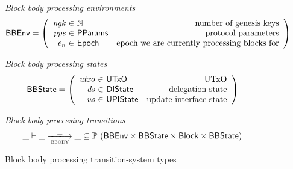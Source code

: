 \documentclass[11pt,a4paper]{article}
\newcommand{\powerset}[1]{\mathbb{P}~#1}
\newcommand{\var}[1]{\mathit{#1}}
\newcommand{\type}[1]{\mathsf{#1}}
\newcommand{\trans}[2]{\xlongrightarrow[\textsc{#1}]{#2}}
\newcommand{\Block}{\type{Block}}
\newcommand{\ProtParams}{\type{PParams}} %
\begin{document}
\begin{figure}[ht]
  \emph{Block body processing environments}
  \begin{equation*}
    \BBEnv =
    \left(
      \begin{array}{r@{~\in~}lr}
        \var{ngk} & \mathbb{N} & \text{number of genesis keys}\\
        \var{pps} & \ProtParams & \text{protocol parameters} \\
        \var{e_n} & \Epoch & \text{epoch we are currently processing blocks for}
      \end{array}
    \right)
  \end{equation*}

  \emph{Block body processing states}
  \begin{equation*}
    \BBState =
    \left(
      \begin{array}{r@{~\in~}lr}
        \var{utxo} & \UTxO & \text{UTxO} \\
        \var{ds} & \DIState & \text{delegation state} \\
        \var{us} & \UPIState & \text{update interface state}
      \end{array}
    \right)
  \end{equation*}

  \emph{Block body processing transitions}
  \begin{equation*}
    \_ \vdash \var{\_} \trans{bbody}{\_} \var{\_} \subseteq
    \powerset (\BBEnv \times \BBState \times \Block \times \BBState)
  \end{equation*}
  \caption{Block body processing transition-system types}
  \label{fig:ts-types:bbody}
\end{figure}
\end{document}
